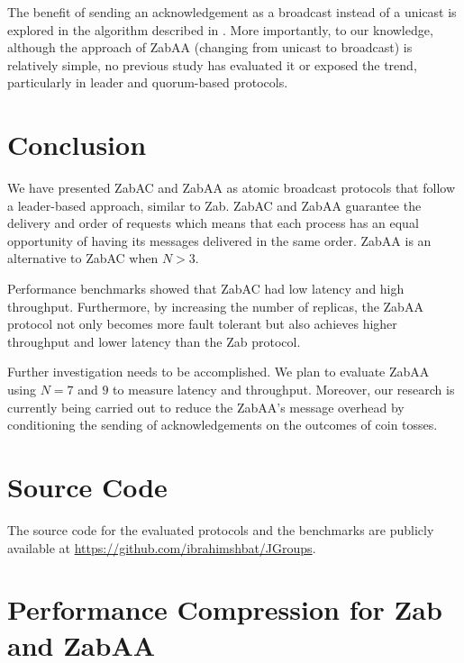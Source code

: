 \documentclass[a4paper,UKenglish]{oasics-v2016}
\begin{document}
The benefit of sending an acknowledgement as a broadcast instead of a unicast is explored in the algorithm described in \cite{r41}. More importantly, to our knowledge, although the approach of ZabAA (changing from unicast to broadcast) is relatively simple, no previous study has evaluated it or exposed the trend, particularly in leader and quorum-based protocols. 



\section{Conclusion} \label{Conclusion}

We have presented ZabAC and ZabAA as atomic broadcast protocols
that follow a leader-based approach, similar to Zab. ZabAC and ZabAA guarantee the delivery and order of requests which means that each process has an equal opportunity of having its messages delivered in the same order. ZabAA is an alternative to ZabAC when $N > 3$.

Performance benchmarks showed that ZabAC had low latency and high throughput. Furthermore, by increasing the number of replicas, the ZabAA protocol not only becomes more fault tolerant but also achieves higher throughput and lower latency than the Zab protocol.


Further investigation needs to be accomplished. We plan to evaluate ZabAA using $N=7$ and $9$ to measure latency and throughput. Moreover, our research is currently being carried out to reduce the ZabAA's message overhead by conditioning the sending of acknowledgements on the outcomes of coin tosses.



\appendix

\section{Source Code}
The source code for the evaluated protocols and the benchmarks are publicly available at \url{https://github.com/ibrahimshbat/JGroups}.

\section{Performance Compression for Zab and ZabAA}
\end{document}
